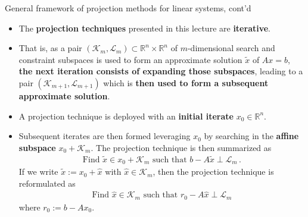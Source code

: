 \documentclass[t,usepdftitle=false]{beamer}
\begin{document}
\begin{frame}{General framework of projection methods for linear systems, cont'd}
\begin{itemize}
\item The \textbf{projection techniques} presented in this lecture are \textbf{iterative}.
\item[] That is, as a pair $(\mathcal{K}_m,\mathcal{L}_m)\subset\mathbb{R}^n\times\mathbb{R}^n$ of $m$-dimensional search and constraint subspaces is used to form an approximate solution $\tilde{x}$ of $Ax=b$, \textbf{the next iteration consists of expanding those subspaces}, leading to a pair $(\mathcal{K}_{m+1},\mathcal{L}_{m+1})$ which is \textbf{then used to form a subsequent approximate solution}.
\item[] A projection technique is deployed with an \textbf{initial iterate} $x_0\in\mathbb{R}^n$.
\item[] Subsequent iterates are then formed leveraging $x_0$ by searching in the \textbf{affine subspace} $x_0+\mathcal{K}_m$.
The projection technique is then summarized as
\begin{align*}
\boxed{
\text{Find }\tilde{x}\in x_0+\mathcal{K}_m\text{ such that }b-A\tilde{x}\perp\mathcal{L}_m
}\,.
\end{align*}
If we write $\tilde{x}:=x_0+\hat{x}$ with $\hat{x}\in\mathcal{K}_m$, then the projection technique is reformulated as\vspace{-.3cm}
\begin{align*}
\boxed{
\text{Find }\hat{x}\in\mathcal{K}_m\text{ such that }r_0-A\hat{x}\perp\mathcal{L}_m
}
\end{align*}
where $r_0:=b-Ax_0$.
\end{itemize}
\end{frame}
\end{document}
